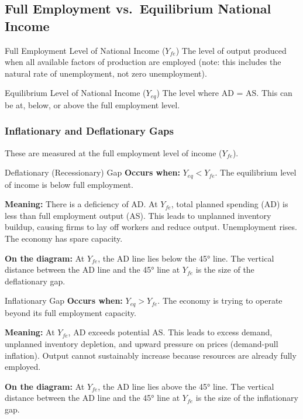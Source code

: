 \documentclass[11pt, a4paper, twoside]{book}
\begin{document}
\subsection{Full Employment vs.\ Equilibrium National Income}

\begin{keyterm}{Full Employment Level of National Income ($Y_{fe}$)}
The level of output produced when all available factors of production are employed (note: this includes the natural rate of unemployment, not zero unemployment).
\end{keyterm}

\begin{keyterm}{Equilibrium Level of National Income ($Y_{eq}$)}
The level where AD = AS. This can be at, below, or above the full employment level.
\end{keyterm}

\subsubsection{Inflationary and Deflationary Gaps}

These are measured at the full employment level of income ($Y_{fe}$).

\begin{keyterm}{Deflationary (Recessionary) Gap}
\textbf{Occurs when:} $Y_{eq} < Y_{fe}$. The equilibrium level of income is below full employment.

\textbf{Meaning:} There is a deficiency of AD. At $Y_{fe}$, total planned spending (AD) is less than full employment output (AS). This leads to unplanned inventory buildup, causing firms to lay off workers and reduce output. Unemployment rises. The economy has spare capacity.

\textbf{On the diagram:} At $Y_{fe}$, the AD line lies below the 45° line. The vertical distance between the AD line and the 45° line at $Y_{fe}$ is the size of the deflationary gap.
\end{keyterm}

\begin{keyterm}{Inflationary Gap}
\textbf{Occurs when:} $Y_{eq} > Y_{fe}$. The economy is trying to operate beyond its full employment capacity.

\textbf{Meaning:} At $Y_{fe}$, AD exceeds potential AS. This leads to excess demand, unplanned inventory depletion, and upward pressure on prices (demand-pull inflation). Output cannot sustainably increase because resources are already fully employed.

\textbf{On the diagram:} At $Y_{fe}$, the AD line lies above the 45° line. The vertical distance between the AD line and the 45° line at $Y_{fe}$ is the size of the inflationary gap.
\end{keyterm}
\end{document}
